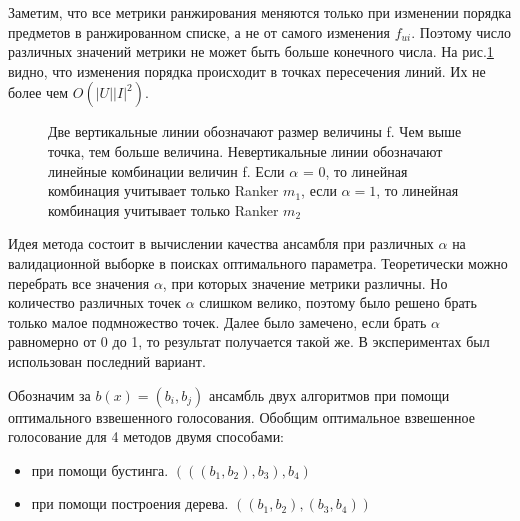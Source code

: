 \documentclass[14pt]{extarticle}
\begin{document}
	Заметим, что все метрики ранжирования меняются только при изменении порядка предметов в ранжированном списке, а не от самого изменения $f_{ui}$. Поэтому число различных значений метрики не может быть больше конечного числа. На рис.\ref{pic:latexpic} видно, что изменения порядка происходит в точках пересечения линий. Их  не более чем $O(|U||I|^2)$. 

\begin{figure}[h]
\caption{Две вертикальные линии обозначают размер величины f. Чем выше точка, тем больше величина. Невертикальные линии обозначают линейные комбинации величин f. Если $\alpha$ = 0, то линейная комбинация учитывает только Ranker $m_1$, если $\alpha = 1$, то  линейная комбинация учитывает только Ranker $m_2$}
\label{pic:latexpic}
\end{figure}
	
	Идея метода состоит в вычислении качества ансамбля при различных $\alpha$ на валидационной выборке в поисках оптимального параметра\cite{learningrank1,learningrank2}. Теоретически  можно перебрать все значения $\alpha$, при которых значение метрики различны. Но количество различных точек $\alpha$ слишком велико, поэтому было решено брать только малое подмножество точек. Далее было замечено, если брать $\alpha$ равномерно от 0 до 1, то результат получается такой же. В экспериментах был использован последний вариант.
	
	Обозначим за $b(x) = (b_i, b_j)$ ансамбль двух алгоритмов при помощи оптимального взвешенного голосования. 
	Обобщим оптимальное взвешенное голосование для 4 методов двумя способами:
	\begin{itemize}
	\item при помощи бустинга. $(((b_1, b_2), b_3), b_4)$
	\item при помощи построения дерева. $((b_1,b_2), (b_3, b_4))$
	\end{itemize}
	
\end{document}
